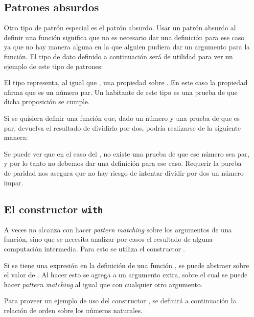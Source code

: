 \subsection{Patrones absurdos}\label{tipos:absurdos}

Otro tipo de patrón especial es el patrón absurdo. Usar un patrón absurdo al definir una función significa que no es necesario dar una definición para ese caso ya que no hay manera alguna en la que alguien pudiera dar un argumento para la función. El tipo de dato definido a continuación será de utilidad para ver un ejemplo de este tipo de patrones:


El tipo   representa, al igual que  , una propiedad sobre . En este caso la propiedad afirma que  es un número par. Un habitante de este tipo es una prueba de que dicha proposición se cumple. 

Si se quisiera definir una función que, dado un número y una prueba de que es par, devuelva el resultado de dividirlo por dos, podría realizarse de la siguiente manera:


Se puede ver que en el caso del , no existe una prueba de que ese número sea par, y por lo tanto no debemos dar una definición para ese caso. Requerir la pureba de paridad nos asegura que no hay riesgo de intentar dividir por dos un número impar. 

\subsection{El constructor \texttt{with}}\label{tipos:with}

A veces no alcanza con hacer \textit{pattern matching} sobre los argumentos de una función, sino que se necesita analizar por casos el resultado de alguna computación intermedia. Para esto se utiliza el constructor . 

Si se tiene una expresión  en la definición de una función , se puede abstraer  sobre el valor de . Al hacer esto se agrega a  un argumento extra, sobre el cual se puede hacer \textit{pattern matching} al igual que con cualquier otro argumento. 

Para proveer un ejemplo de uso del constructor , se definirá a continuación la relación de orden \AgdaFunction{\_<\_} sobre los números naturales.

